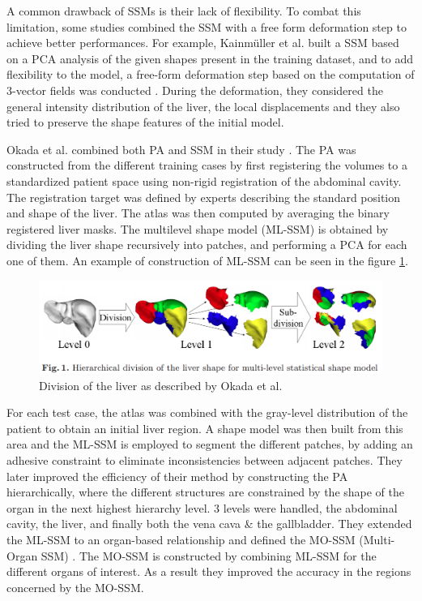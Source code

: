 \documentclass[]{article}
\begin{document}
A common drawback of SSMs is their lack of flexibility. To combat this
limitation, some studies combined the SSM with a free form deformation
step to achieve better performances. For example, Kainmüller et al. built a SSM based on a PCA analysis of the given shapes
present in the training dataset, and to add flexibility to the model, a
free-form deformation step based on the computation of 3-vector fields
was conducted \cite{Kainmueller2007}. During the deformation, they considered the general
intensity distribution of the liver, the local displacements and they
also tried to preserve the shape features of the initial model.

Okada et al. combined both PA and SSM in their study \cite{Okada2008}. The PA was
constructed from the different training cases by first registering the
volumes to a standardized patient space using non-rigid registration of
the abdominal cavity. The registration target was defined by experts
describing the standard position and shape of the liver. The atlas was
then computed by averaging the binary registered liver masks. The
multilevel shape model (ML-SSM) is obtained by dividing the liver shape
recursively into patches, and performing a PCA for each one of them. An
example of construction of ML-SSM can be seen in the figure \ref{Okada2008_Fig1}.

\begin{figure}[th!]
	\centering
	\includegraphics[width=0.7\linewidth]{images/image38}
	\caption{Division of the liver as described by Okada et al. \cite{Okada2008}}
	\label{Okada2008_Fig1}
\end{figure}



For each test case, the atlas was combined with the gray-level
distribution of the patient to obtain an initial liver region. A shape
model was then built from this area and the ML-SSM is employed to
segment the different patches, by adding an adhesive constraint to
eliminate inconsistencies between adjacent patches. They later improved
the efficiency of their method by constructing the PA hierarchically,
where the different structures are constrained by the shape of the organ
in the next highest hierarchy level. 3 levels were handled, the
abdominal cavity, the liver, and finally both the vena cava \& the
gallbladder. They extended the ML-SSM to an organ-based relationship and
defined the MO-SSM (Multi-Organ SSM) \cite{Okada2008}. The MO-SSM is constructed by combining ML-SSM for the
different organs of interest. As a result they improved the accuracy in
the regions concerned by the MO-SSM.
\end{document}
